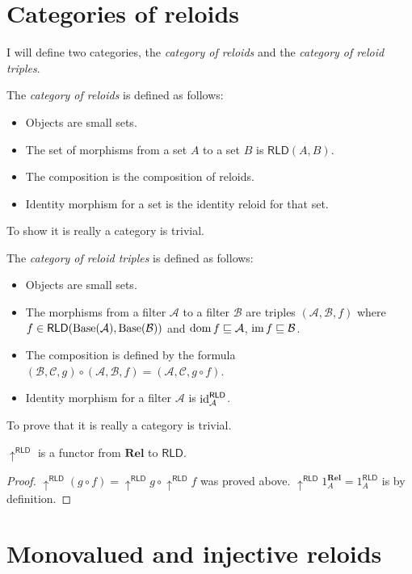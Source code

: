 \section{Categories of reloids}

I will define two categories, the \emph{category of reloids} and the
\emph{category of reloid triples}.

The \emph{category of reloids} is defined
as follows:
\begin{itemize}
\item Objects are small sets.
\item The set of morphisms from a set $A$ to a set $B$ is $\mathsf{RLD}(A,B)$.
\item The composition is the composition of reloids.
\item Identity morphism for a set is the identity reloid for that set.
\end{itemize}
To show it is really a category is trivial.

The \emph{category of reloid triples}
is defined as follows:
\begin{itemize}
\item Objects are small sets.
\item The morphisms from a filter $\mathcal{A}$ to a filter $\mathcal{B}$
are triples $(\mathcal{A},\mathcal{B},f)$ where $f\in\mathsf{RLD}(\operatorname{Base}(\mathcal{A}),\operatorname{Base}(\mathcal{B}))$
and $\operatorname{dom} f\sqsubseteq\mathcal{A}$, $\operatorname{im} f\sqsubseteq\mathcal{B}$.
\item The composition is defined by the formula $(\mathcal{B},\mathcal{C},g)\circ(\mathcal{A},\mathcal{B},f)=(\mathcal{A},\mathcal{C},g\circ f)$.
\item Identity morphism for a filter $\mathcal{A}$ is $\operatorname{id}_{\mathcal{A}}^{\mathsf{\mathsf{RLD}}}$.
\end{itemize}
To prove that it is really a category is trivial.
\begin{prop}
$\uparrow^{\mathsf{RLD}}$ is a functor from $\mathbf{Rel}$ to $\mathsf{RLD}$.\end{prop}
\begin{proof}
$\uparrow^{\mathsf{RLD}}(g\circ f)=\uparrow^{\mathsf{RLD}}g\circ\uparrow^{\mathsf{RLD}}f$
was proved above. $\uparrow^{\mathsf{RLD}}1_{A}^{\mathbf{Rel}}=1_{A}^{\mathsf{RLD}}$
is by definition.
\end{proof}

\section{Monovalued and injective reloids}

